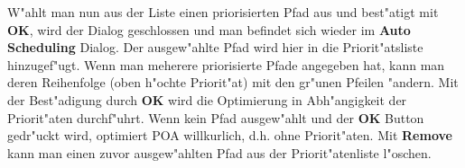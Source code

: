 \documentclass[a4paper,titlepage,12pt,ngerman]{scrbook}
\begin{document}
W"ahlt man nun aus der Liste einen priorisierten Pfad aus und best"atigt mit {\bf OK}, wird der Dialog geschlossen und man befindet sich wieder im {\bf Auto Scheduling} Dialog. Der ausgew"ahlte Pfad wird hier in die Priorit"atsliste hinzugef"ugt. Wenn man meherere priorisierte Pfade angegeben hat, kann man deren Reihenfolge (oben h"ochte Priorit"at) mit den gr"unen Pfeilen "andern. Mit der Best"adigung durch {\bf OK} wird die Optimierung in Abh"angigkeit der Priorit"aten durchf"uhrt.\newline
Wenn kein Pfad ausgew"ahlt und der {\bf OK} Button gedr"uckt wird, optimiert POA willkurlich, d.h. ohne Priorit"aten.\newline
Mit {\bf Remove} kann man einen zuvor ausgew"ahlten Pfad aus der Priorit"atenliste l"oschen.

\newpage
\end{document}
